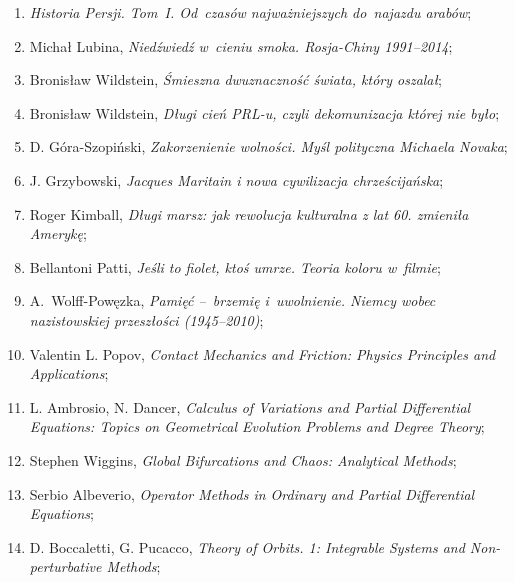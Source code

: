 \documentclass[a4paper,11pt]{article}
\begin{document}
\begin{enumerate}
\item \emph{Historia Persji. Tom~I. Od~czasów najważniejszych
    do~najazdu arabów};

\item Michał Lubina, \emph{Niedźwiedź w~cieniu smoka. Rosja-Chiny
    1991--2014};

\item Bronisław Wildstein, \emph{Śmieszna dwuznaczność świata, który
    oszalał};

\item Bronisław Wildstein, \emph{Długi cień PRL-u, czyli dekomunizacja
    której nie było};

\item D. Góra-Szopiński, \emph{Zakorzenienie wolności. Myśl polityczna
    Michaela Novaka};

\item J. Grzybowski, \emph{Jacques Maritain i nowa cywilizacja
    chrześcijańska};

\item Roger Kimball, \emph{Długi marsz: jak rewolucja kulturalna z lat
    60. zmieniła Amerykę};

\item Bellantoni Patti, \emph{Jeśli to fiolet, ktoś umrze. Teoria
    koloru w~filmie};

\item A.~Wolff-Powęzka, \emph{Pamięć --~brzemię i~uwolnienie. Niemcy
    wobec nazistowskiej przeszłości (1945--2010)};

\item Valentin L. Popov, \emph{Contact Mechanics and Friction: Physics
    Principles and Applications};

\item L. Ambrosio, N. Dancer, \emph{Calculus of Variations and Partial
    Differential Equations: Topics on Geometrical Evolution Problems
    and Degree Theory};

\item Stephen Wiggins, \emph{Global Bifurcations and Chaos: Analytical
    Methods};

\item Serbio Albeverio, \emph{Operator Methods in Ordinary and Partial
    Differential Equations};

\item D. Boccaletti, G. Pucacco, \emph{Theory of Orbits. 1: Integrable Systems and Non-perturbative Methods};


\end{enumerate}
\end{document}
